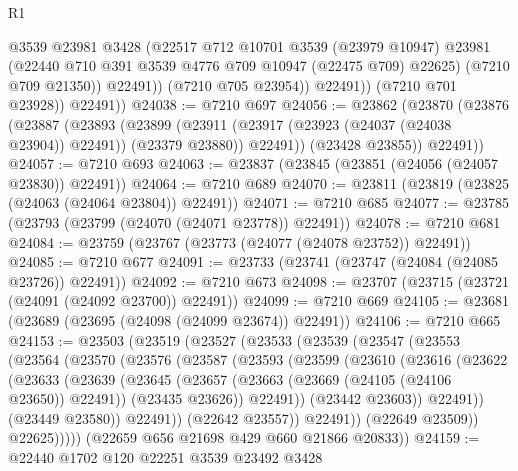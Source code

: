 \begin{lexlean}{R1}
\begin{coremodule}
                    @3539
                    @23981
                    @3428
                    (@22517
                      @712
                      @10701
                      @3539
                      (@23979 @10947)
                      @23981
                      (@22440 @710 @391 @3539 @4776 @709 @10947 (@22475 @709) @22625)
                      (@7210 @709 @21350))
                    @22491))
                (@7210 @705 @23954))
              @22491))
          (@7210 @701 @23928))
        @22491))
@24038 := @7210 @697
@24056 := @23862
    (@23870
      (@23876
        (@23887
          (@23893
            (@23899
              (@23911 (@23917 (@23923 (@24037 (@24038 @23904)) @22491)) (@23379 @23880))
              @22491))
          (@23428 @23855))
        @22491))
@24057 := @7210 @693
@24063 := @23837 (@23845 (@23851 (@24056 (@24057 @23830)) @22491))
@24064 := @7210 @689
@24070 := @23811 (@23819 (@23825 (@24063 (@24064 @23804)) @22491))
@24071 := @7210 @685
@24077 := @23785 (@23793 (@23799 (@24070 (@24071 @23778)) @22491))
@24078 := @7210 @681
@24084 := @23759 (@23767 (@23773 (@24077 (@24078 @23752)) @22491))
@24085 := @7210 @677
@24091 := @23733 (@23741 (@23747 (@24084 (@24085 @23726)) @22491))
@24092 := @7210 @673
@24098 := @23707 (@23715 (@23721 (@24091 (@24092 @23700)) @22491))
@24099 := @7210 @669
@24105 := @23681 (@23689 (@23695 (@24098 (@24099 @23674)) @22491))
@24106 := @7210 @665
@24153 := @23503
    (@23519
      (@23527
        (@23533
          (@23539
            (@23547
              (@23553
                (@23564
                  (@23570
                    (@23576
                      (@23587
                        (@23593
                          (@23599
                            (@23610
                              (@23616
                                (@23622
                                  (@23633
                                    (@23639
                                      (@23645
                                        (@23657
                                          (@23663 (@23669 (@24105 (@24106 @23650)) @22491))
                                          (@23435 @23626))
                                        @22491))
                                    (@23442 @23603))
                                  @22491))
                              (@23449 @23580))
                            @22491))
                        (@22642 @23557))
                      @22491))
                  (@22649 @23509))
                @22625)))))
      (@22659 @656 @21698 @429 @660 @21866 @20833))
@24159 := @22440 @1702 @120 @22251 @3539 @23492 @3428

\end{coremodule}
\end{lexlean}

